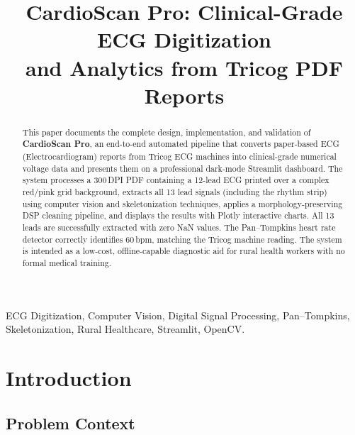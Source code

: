 \documentclass[conference]{IEEEtran}
\begin{document}
\title{CardioScan Pro: Clinical-Grade ECG Digitization\\and Analytics from Tricog PDF Reports}

\author{

}

\maketitle

\begin{abstract}
This paper documents the complete design, implementation, and validation of
\textbf{CardioScan Pro}, an end-to-end automated pipeline that converts
paper-based ECG (Electrocardiogram) reports from Tricog ECG machines into
clinical-grade numerical voltage data and presents them on a professional
dark-mode Streamlit dashboard. The system processes a 300\,DPI PDF containing
a 12-lead ECG printed over a complex red/pink grid background, extracts all
13 lead signals (including the rhythm strip) using computer vision and
skeletonization techniques, applies a morphology-preserving DSP cleaning
pipeline, and displays the results with Plotly interactive charts. All 13
leads are successfully extracted with zero NaN values. The Pan--Tompkins heart
rate detector correctly identifies 60\,bpm, matching the Tricog machine
reading. The system is intended as a low-cost, offline-capable diagnostic aid
for rural health workers with no formal medical training.
\end{abstract}

\begin{IEEEkeywords}
ECG Digitization, Computer Vision, Digital Signal Processing, Pan--Tompkins,
Skeletonization, Rural Healthcare, Streamlit, OpenCV.
\end{IEEEkeywords}

\section{Introduction}

\subsection{Problem Context}
\end{document}
